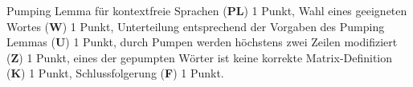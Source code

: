 \begin{bewertung}
Pumping Lemma für kontextfreie Sprachen ({\bf PL}) 1 Punkt,
Wahl eines geeigneten Wortes ({\bf W}) 1 Punkt,
Unterteilung entsprechend der Vorgaben des Pumping Lemmas ({\bf U}) 1 Punkt,
durch Pumpen werden höchstens zwei Zeilen modifiziert ({\bf Z}) 1 Punkt,
eines der gepumpten Wörter ist keine korrekte Matrix-Definition ({\bf K})
1 Punkt,
Schlussfolgerung ({\bf F}) 1 Punkt.
\end{bewertung}

